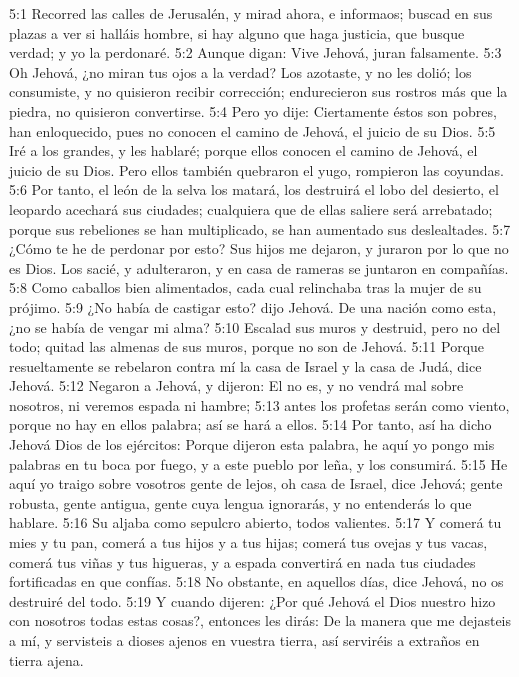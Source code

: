 5:1 Recorred las calles de Jerusalén, y mirad ahora, e informaos; buscad en sus plazas a ver si halláis hombre, si hay alguno que haga justicia, que busque verdad; y yo la perdonaré. 
5:2 Aunque digan: Vive Jehová, juran falsamente. 
5:3 Oh Jehová, ¿no miran tus ojos a la verdad? Los azotaste, y no les dolió; los consumiste, y no quisieron recibir corrección; endurecieron sus rostros más que la piedra, no quisieron convertirse. 
5:4 Pero yo dije: Ciertamente éstos son pobres, han enloquecido, pues no conocen el camino de Jehová, el juicio de su Dios. 
5:5 Iré a los grandes, y les hablaré; porque ellos conocen el camino de Jehová, el juicio de su Dios. Pero ellos también quebraron el yugo, rompieron las coyundas. 
5:6 Por tanto, el león de la selva los matará, los destruirá el lobo del desierto, el leopardo acechará sus ciudades; cualquiera que de ellas saliere será arrebatado; porque sus rebeliones se han multiplicado, se han aumentado sus deslealtades. 
5:7 ¿Cómo te he de perdonar por esto? Sus hijos me dejaron, y juraron por lo que no es Dios. Los sacié, y adulteraron, y en casa de rameras se juntaron en compañías. 
5:8 Como caballos bien alimentados, cada cual relinchaba tras la mujer de su prójimo. 
5:9 ¿No había de castigar esto? dijo Jehová. De una nación como esta, ¿no se había de vengar mi alma? 
5:10 Escalad sus muros y destruid, pero no del todo; quitad las almenas de sus muros, porque no son de Jehová. 
5:11 Porque resueltamente se rebelaron contra mí la casa de Israel y la casa de Judá, dice Jehová. 
5:12 Negaron a Jehová, y dijeron: El no es, y no vendrá mal sobre nosotros, ni veremos espada ni hambre; 
5:13 antes los profetas serán como viento, porque no hay en ellos palabra; así se hará a ellos. 
5:14 Por tanto, así ha dicho Jehová Dios de los ejércitos: Porque dijeron esta palabra, he aquí yo pongo mis palabras en tu boca por fuego, y a este pueblo por leña, y los consumirá. 
5:15 He aquí yo traigo sobre vosotros gente de lejos, oh casa de Israel, dice Jehová; gente robusta, gente antigua, gente cuya lengua ignorarás, y no entenderás lo que hablare. 
5:16 Su aljaba como sepulcro abierto, todos valientes. 
5:17 Y comerá tu mies y tu pan, comerá a tus hijos y a tus hijas; comerá tus ovejas y tus vacas, comerá tus viñas y tus higueras, y a espada convertirá en nada tus ciudades fortificadas en que confías. 
5:18 No obstante, en aquellos días, dice Jehová, no os destruiré del todo. 
5:19 Y cuando dijeren: ¿Por qué Jehová el Dios nuestro hizo con nosotros todas estas cosas?, entonces les dirás: De la manera que me dejasteis a mí, y servisteis a dioses ajenos en vuestra tierra, así serviréis a extraños en tierra ajena. 
